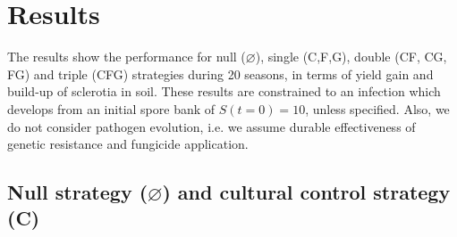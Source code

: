\documentclass{article}
\begin{document}
%
%
%
% 
\section{Results}

The results show the performance for null ($\varnothing$), single (C,F,G), double (CF, CG, FG) and triple (CFG) strategies during 20 seasons, in terms of yield gain and build-up of sclerotia in soil. These results are constrained to an infection which develops from an initial spore bank of $S(t=0) = 10$, unless specified.  Also, we do not consider pathogen evolution, i.e. we assume durable effectiveness of genetic resistance and fungicide application.
 
 
 \subsection{Null strategy ($\varnothing$) and cultural control strategy (C)}
 
\end{document}
